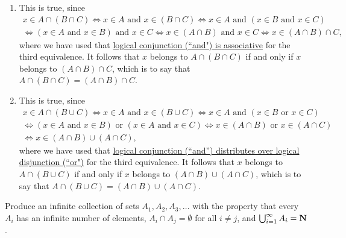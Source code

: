 \documentclass{lew98_solutions}
\begin{document}
\begin{solution}
\begin{enumerate}
        \item This is true, since
        \begin{gather*}
            x \in A \cap (B \cap C) \iff x \in A \text{ and } x \in (B \cap C) \iff x \in A \text{ and } (x \in B \text{ and } x \in C) \\[2mm]
            \iff (x \in A \text{ and } x \in B) \text{ and } x \in C \iff x \in (A \cap B) \text{ and } x \in C \iff x \in (A \cap B) \cap C,
        \end{gather*}
        where we have used that \href{https://en.wikipedia.org/wiki/Propositional_calculus#Basic_and_derived_argument_forms}{logical conjunction (``and") is associative} for the third equivalence. It follows that \( x \) belongs to \( A \cap (B \cap C) \) if and only if \( x \) belongs to \( (A \cap B) \cap C \), which is to say that \( A \cap (B \cap C) = (A \cap B) \cap C \).

        \item This is true, since
        \begin{gather*}
            x \in A \cap (B \cup C) \iff x \in A \text{ and } x \in (B \cup C) \iff x \in A \text{ and } (x \in B \text{ or } x \in C) \\[2mm]
            \iff (x \in A \text{ and } x \in B) \text{ or } (x \in A \text{ and } x \in C) \iff x \in (A \cap B) \text{ or } x \in (A \cap C) \\[2mm]
            \iff x \in (A \cap B) \cup (A \cap C),
        \end{gather*}
        where we have used that \href{https://en.wikipedia.org/wiki/Propositional_calculus#Basic_and_derived_argument_forms}{logical conjunction (``and'') distributes over logical disjunction (``or")} for the third equivalence. It follows that \( x \) belongs to \( A \cap (B \cup C) \) if and only if \( x \) belongs to \( (A \cap B) \cup (A \cap C) \), which is to say that \( A \cap (B \cup C) = (A \cap B) \cup (A \cap C) \).
    \end{enumerate}
\end{solution}

\begin{exercise}
\label{ex:1.2.4}
    Produce an infinite collection of sets \( A_1, A_2, A_3, \ldots \) with the property that every \( A_i \) has an infinite number of elements, \( A_i \cap A_j = \emptyset \) for all \( i \neq j \), and \( \bigcup_{i=1}^{\infty} A_i = \mathbf{N} \).
\end{exercise}
\end{document}

